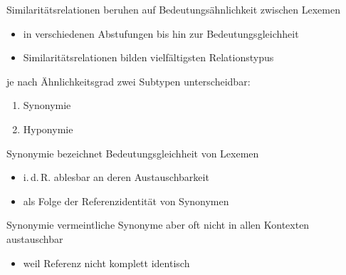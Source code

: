 \begin{frame}{Similaritätsrelationen}
\onslide<+->
beruhen auf Bedeutungsähnlichkeit zwischen Lexemen
\begin{itemize}[<+->]
	\item		in verschiedenen Abstufungen bis hin zur Bedeutungsgleichheit
	\item		Similaritätsrelationen bilden vielfältigsten Relationstypus
\end{itemize}
\onslide<+->
\Zeile
je nach Ähnlichkeitsgrad zwei Subtypen unterscheidbar:
\begin{enumerate}[<+->]
	\item		Synonymie
	\item		Hyponymie
\end{enumerate}
\end{frame}

\begin{frame}{Synonymie}
\onslide<+->
bezeichnet Bedeutungsgleichheit von Lexemen
\begin{itemize}[<+->]
	\item		i.\,d.\,R. ablesbar an deren Austauschbarkeit
	\item		als Folge der Referenzidentität von Synonymen
\end{itemize}
\onslide<+->
\Zeile
\begin{exe}
	 \onslide<+->
	 \onslide<+->
\end{exe}
\end{frame}

\begin{frame}{Synonymie}
\onslide<+->
vermeintliche Synonyme aber oft nicht in allen Kontexten austauschbar
\begin{itemize}[<+->]
	\item		weil Referenz nicht komplett identisch
\end{itemize}
\onslide<+->
\Zeile
\begin{exe}
	 \onslide<+->
	 \onslide<+->
\end{exe}
\end{frame}

